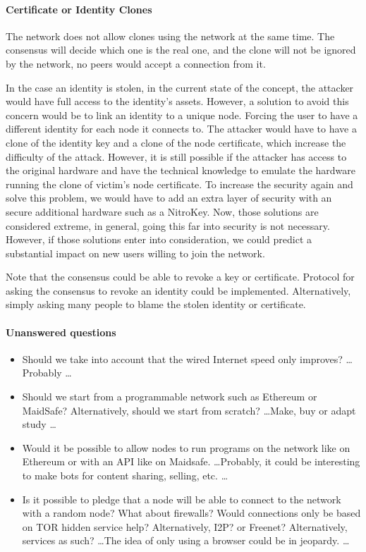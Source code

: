 \paragraph{Certificate or Identity Clones} The network does not allow clones using the network at the same time. The consensus will decide which one is the real one, and the clone will not be ignored by the network, no peers would accept a connection from it.

In the case an identity is stolen, in the current state of the concept, the attacker would have full access to the identity's assets. However, a solution to avoid this concern would be to link an identity to a unique node. Forcing the user to have a different identity for each node it connects to. The attacker would have to have a clone of the identity key and a clone of the node certificate, which increase the difficulty of the attack. However, it is still possible if the attacker has access to the original hardware and have the technical knowledge to emulate the hardware running the clone of victim's node certificate. To increase the security again and solve this problem, we would have to add an extra layer of security with an secure additional hardware such as a NitroKey\cite{NitrokeyNitokey}. Now, those solutions are considered extreme, in general, going this far into security is not necessary.  However, if those solutions enter into consideration, we could predict a substantial impact on new users willing to join the network.

Note that the consensus could be able to revoke a key or certificate. Protocol for asking the consensus to revoke an identity could be implemented. Alternatively, simply asking many people to blame the stolen identity or certificate.

\paragraph{Unanswered questions}
\begin{itemize}
\item Should we take into account that the wired Internet speed only improves?
\dots Probably \dots

\item Should we start from a programmable network such as Ethereum or MaidSafe? Alternatively, should we start from scratch?
\dots Make, buy or adapt study \dots

\item Would it be possible to allow nodes to run programs on the network like on Ethereum or with an API like on Maidsafe\cite{MaidSafe2014MaidSafe.netCommunity}.
\dots Probably, it could be interesting to make bots for content sharing, selling, etc. \dots

\item Is it possible to pledge that a node will be able to connect to the network with a random node? What about firewalls? Would connections only be based on TOR hidden service help? Alternatively, I2P? or Freenet? Alternatively, services as such? 
\dots The idea of only using a browser could be in jeopardy. \dots

\end{itemize}

